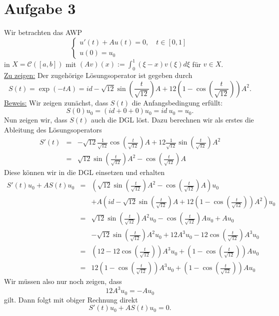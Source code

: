 \documentclass[10pt,a4paper]{article}
\begin{document}
\section*{Aufgabe 3}
Wir betrachten das AWP
\begin{equation}
	\begin{cases}
	u'(t) + Au(t) = 0, \quad t\in [0,1]\\
	u(0) = u_0
	\end{cases}
\end{equation}
in $X=\mathcal{C}([a,b])$ mit $(Av)(x) := \int_0^1 (\xi - x) v(\xi) d\xi$ für $v \in X$.	\\
\underline{Zu zeigen:} Der zugehörige Lösungsoperator ist gegeben durch
\begin{equation}
	S(t) = \exp(-tA) = id - \sqrt{12} \sin\left(\frac{t}{\sqrt{12}}\right) A + 12 \left( 1 - \cos\left(\frac{t}{\sqrt{12}}\right) \right) A^2.
\end{equation}
\underline{Beweis:} Wir zeigen zunächst, dass $S(t)$ die Anfangsbedingung erfüllt:
\begin{equation}
	S(0)u_0 = (id + 0 + 0) u_0 = id \ u_0 = u_0.
\end{equation}
Nun zeigen wir, dass $S(t)$ auch die DGL löst. Dazu berechnen wir als erstes die Ableitung des Lösungsoperators
\begin{eqnarray}
	S'(t) &=& -\sqrt{12} \frac{1}{\sqrt{12}} \cos\left(\frac{t}{\sqrt{12}}\right) A + 12 \frac{1}{\sqrt{12}} \sin\left(\frac{t}{\sqrt{12}}\right) A^2\\
	&=& \sqrt{12} \sin\left(\frac{t}{\sqrt{12}}\right) A^2 - \cos\left(\frac{t}{\sqrt{12}}\right) A
\end{eqnarray}
Diese können wir in die DGL einsetzen und erhalten
\begin{eqnarray}
	S'(t)u_0 +AS(t)u_0 &=& \left( \sqrt{12} \sin\left(\frac{t}{\sqrt{12}}\right) A^2 - \cos\left(\frac{t}{\sqrt{12}}\right) A \right) u_0 \\
	&& + A \left( id - \sqrt{12} \sin\left(\frac{t}{\sqrt{12}}\right) A + 12 \left( 1 - \cos\left(\frac{t}{\sqrt{12}}\right) \right) A^2 \right) u_0\\
	&=& \sqrt{12} \sin\left(\frac{t}{\sqrt{12}}\right) A^2 u_0 - \cos\left(\frac{t}{\sqrt{12}}\right) A u_0 + A u_0\\&& - \sqrt{12} \sin\left(\frac{t}{\sqrt{12}}\right) A^2 u_0 + 12 A^3 u_0 - 12 \cos\left(\frac{t}{\sqrt{12}}\right) A^3 u_0\\
	&=& \left(12 - 12 \cos\left(\frac{t}{\sqrt{12}}\right) \right) A^3 u_0 + \left( 1 - \cos\left(\frac{t}{\sqrt{12}}\right) \right) A u_0\\
	&=& 12 \left( 1 - \cos\left(\frac{t}{\sqrt{12}}\right) \right) A^3 u_0 + \left( 1 - \cos\left(\frac{t}{\sqrt{12}}\right) \right) A u_0
\end{eqnarray}
Wir müssen also nur noch zeigen, dass
\begin{equation}
	12 A^3 u_0 = - A u_0
\end{equation}
gilt. Dann folgt mit obiger Rechnung direkt
\begin{equation}
	S'(t) u_0 + A S(t) u_0 = 0.
\end{equation}
\end{document}
